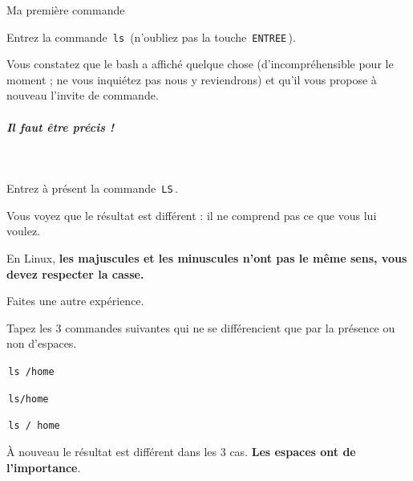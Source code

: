 \documentclass[a4paper,11pt]{article}
\begin{document}
\par
        
\begin{Tutoriel}{Ma premi\`ere commande}
\begin{steps}
\item Entrez la commande \,\verb|ls|\, (n'oubliez pas la touche \,\verb|ENTREE|\,).
\end{steps}				
\par
        
Vous constatez que le bash a affich\'e quelque chose (d'incompr\'ehensible pour le moment ; ne vous inqui\'etez pas nous y reviendrons) et qu'il vous propose \`a nouveau l'invite de commande.
				
\par
        
			
\subparagraph{Il faut \^etre pr\'ecis !} 
\textcolor{white}{.} \par
\begin{steps}
\item Entrez \`a pr\'esent  la commande \,\verb|LS|\,.
\end{steps}
				
\par
        
Vous voyez que le r\'esultat est diff\'erent : il ne comprend pas ce que vous lui voulez.
        
\par
        
En Linux, \textbf{les majuscules et les minuscules n'ont pas le m\^eme sens, vous devez respecter la casse.}
\par
        
Faites une autre exp\'erience. 
        
\par
        
Tapez les 3 commandes suivantes qui ne se diff\'erencient que par la pr\'esence ou non d'espaces.
				
\par
        
\begin{steps}
				
\item \,\verb|ls /home|\,
\item \,\verb|ls/home|\,
\item \,\verb|ls / home|\,

\end{steps}
				
\`A nouveau le r\'esultat est diff\'erent dans les 3 cas. \textbf{Les espaces ont de l'importance}.
\end{Tutoriel}				
\par
\end{document}
